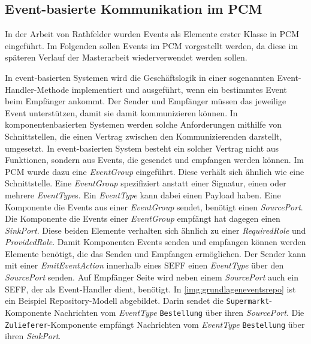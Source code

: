 \subsection{Event-basierte Kommunikation im PCM}
In der Arbeit von Rathfelder \cite{Rathfelder2013} wurden Events als Elemente erster Klasse in PCM eingeführt. Im Folgenden sollen Events im PCM vorgestellt werden, da diese im späteren Verlauf der Masterarbeit wiederverwendet werden sollen. \par
In event-basierten Systemen wird die Geschäftslogik in einer sogenannten Event-Handler-Methode implementiert und ausgeführt, wenn ein bestimmtes Event beim Empfänger ankommt. Der Sender und Empfänger müssen das jeweilige Event unterstützen, damit sie damit kommunizieren können. In komponentenbasierten Systemen werden solche Anforderungen mithilfe von Schnittstellen, die einen Vertrag zwischen den Kommunizierenden darstellt, umgesetzt. In event-basierten System besteht ein solcher Vertrag nicht aus Funktionen, sondern aus Events, die gesendet und empfangen werden können. Im PCM wurde dazu eine \emph{EventGroup} eingeführt. Diese verhält sich ähnlich wie eine Schnittstelle. Eine \emph{EventGroup} spezifiziert anstatt einer Signatur, einen oder mehrere \emph{EventType}s. Ein \emph{EventType} kann dabei einen Payload haben. Eine Komponente die Events aus einer \emph{EventGroup} sendet, benötigt einen \emph{SourcePort}. Die Komponente die Events einer \emph{EventGroup} empfängt hat dagegen einen \emph{SinkPort}. Diese beiden Elemente verhalten sich ähnlich zu einer \emph{RequiredRole} und \emph{ProvidedRole}. 
Damit Komponenten Events senden und empfangen können werden Elemente benötigt, die das Senden und Empfangen ermöglichen. Der Sender kann mit einer \emph{EmitEventAction} innerhalb eines SEFF einen \emph{EventType} über den \emph{SourcePort} senden. Auf Empfänger Seite wird neben einem \emph{SourcePort} auch ein SEFF, der als Event-Handler dient, benötigt. In \autoref{img:grundlageneventsrepo} ist ein Beispiel Repository-Modell abgebildet. Darin sendet die \texttt{Supermarkt}-Komponente Nachrichten vom \emph{EventType} \texttt{Bestellung} über ihren \emph{SourcePort}. Die \texttt{Zulieferer}-Komponente empfängt Nachrichten vom \emph{EventType} \texttt{Bestellung} über ihren \emph{SinkPort}.

